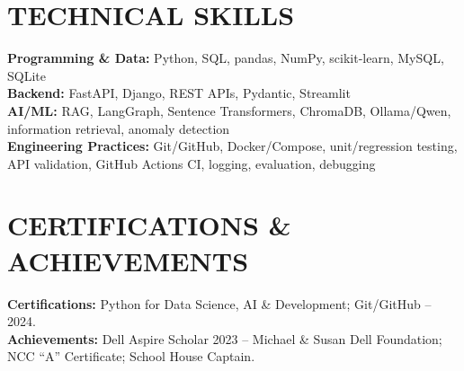 \documentclass[10pt,a4paper]{article}
\begin{document}
\section*{TECHNICAL SKILLS}
\textbf{Programming \& Data:} Python, SQL, pandas, NumPy, scikit-learn, MySQL, SQLite\\
\textbf{Backend:} FastAPI, Django, REST APIs, Pydantic, Streamlit\\
\textbf{AI/ML:} RAG, LangGraph, Sentence Transformers, ChromaDB, Ollama/Qwen, information retrieval, anomaly detection\\
\textbf{Engineering Practices:} Git/GitHub, Docker/Compose, unit/regression testing, API validation, GitHub Actions CI, logging, evaluation, debugging

\section*{CERTIFICATIONS \& ACHIEVEMENTS}
{\fontsize{9pt}{10pt}\selectfont
\textbf{Certifications:} Python for Data Science, AI \& Development; Git/GitHub -- 2024.\\[-1pt]
\textbf{Achievements:} Dell Aspire Scholar 2023 -- Michael \& Susan Dell Foundation; NCC ``A'' Certificate; School House Captain.
}
\end{document}

